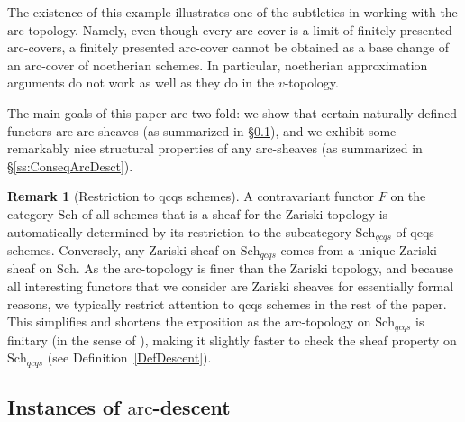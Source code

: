 \documentclass[reqno]{amsart}
\newcommand{\arc}{\mathrm{arc}}
\theoremstyle{definition}
\newtheorem{remark}[theorem]{Remark}
\begin{document}
The existence of this example illustrates one of the subtleties in working with the $\arc$-topology. Namely, even though every $\arc$-cover is a limit of finitely presented $\arc$-covers, a finitely presented $\arc$-cover cannot be obtained as a base change of an $\arc$-cover of noetherian schemes. In particular, noetherian approximation arguments do not work as well as they do in the $v$-topology. 

The main goals of this paper are two fold: we show that certain naturally defined functors are $\arc$-sheaves (as summarized in \S \ref{ss:InstantArcDesc}), and we exhibit some remarkably nice structural properties of any $\arc$-sheaves (as summarized in \S \ref{ss:ConseqArcDesct}).

\begin{remark}[Restriction to qcqs schemes]
A contravariant functor $F$ on the category $\mathrm{Sch}$ of all schemes that is a sheaf for the Zariski topology is automatically determined by its restriction to the subcategory $\mathrm{Sch}_{qcqs}$ of qcqs schemes. Conversely, any Zariski sheaf on $\mathrm{Sch}_{qcqs}$ comes from a unique Zariski sheaf on $\mathrm{Sch}$. As the $\arc$-topology is finer than the Zariski topology, and because all interesting functors that we consider are Zariski sheaves for essentially formal reasons, we typically restrict attention to qcqs schemes in the rest of the paper. This simplifies and shortens the exposition as the $\arc$-topology on $\mathrm{Sch}_{qcqs}$ is finitary (in the sense of \cite[\S A.3.1]{SAG}), making it slightly faster to check the sheaf property on $\mathrm{Sch}_{qcqs}$ (see Definition~\ref{DefDescent}). 
\end{remark}

\subsection{Instances of $\arc$-descent}
\label{ss:InstantArcDesc}
\end{document}
